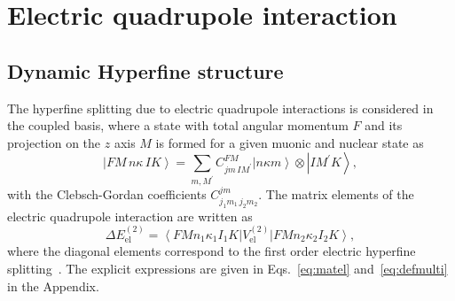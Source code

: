 \section{Electric quadrupole interaction}
\subsection{Dynamic Hyperfine structure}
The hyperfine splitting due to electric quadrupole interactions is considered in the coupled basis, where a state with total angular momentum $F$ and its projection on the $z$  axis $M$ is formed for a given muonic and nuclear state as
\begin{equation}
\left| FM\,n\kappa\,IK \right> = \sum_{m,M^\prime} C^{FM}_{jm\,IM^\prime} \left|n\kappa m\right>\otimes\left|IM^\prime K\right>,
\end{equation}
with the Clebsch-Gordan coefficients $C^{jm}_{j_1m_1\,j_2m_2}$. The matrix elements of the electric quadrupole interaction are written as
\begin{equation}
\Delta E^{(2)}_{\text{el}} = \left< FMn_1\kappa_1I_1K\right|{V_{\text{el}}^{(2)}}\left|FMn_2\kappa_2I_2K\right>,
\label{eq:quadel}
\end{equation}
where the diagonal elements correspond to the first order electric hyperfine splitting~\cite{michel2017}. The explicit expressions are given in Eqs.~\eqref{eq:matel} and~\eqref{eq:defmulti} in the Appendix.
